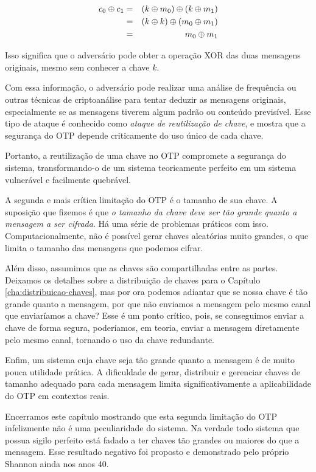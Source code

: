\begin{eqnarray*}
  c_0 \oplus c_1 & = & (k \oplus m_0) \oplus (k \oplus m_1)\\
              & = & (k \oplus k) \oplus (m_0 \oplus m_1)\\
              & = & m_0 \oplus m_1
\end{eqnarray*}

Isso significa que o adversário pode obter a operação XOR das duas mensagens originais, mesmo sem conhecer a chave $k$.

Com essa informação, o adversário pode realizar uma análise de frequência ou outras técnicas de criptoanálise para tentar deduzir as mensagens originais, especialmente se as mensagens tiverem algum padrão ou conteúdo previsível.
Esse tipo de ataque é conhecido como {\em ataque de reutilização de chave}, e mostra que a segurança do OTP depende criticamente do uso único de cada chave.

Portanto, a reutilização de uma chave no OTP compromete a segurança do sistema, transformando-o de um sistema teoricamente perfeito em um sistema vulnerável e facilmente quebrável.

A segunda e mais crítica limitação do OTP é o tamanho de sua chave.
A suposição que fizemos é que {\em o tamanho da chave deve ser tão grande quanto a mensagem a ser cifrada}.
Há uma série de problemas práticos com isso.
Computacionalmente, não é possível gerar chaves aleatórias muito grandes, o que limita o tamanho das mensagens que podemos cifrar.

Além disso, assumimos que as chaves são compartilhadas entre as partes.
Deixamos os detalhes sobre a distribuição de chaves para o Capítulo \ref{cha:distribuicao-chaves}, mas por ora podemos adiantar que se nossa chave é tão grande quanto a mensagem, por que não enviamos a mensagem pelo mesmo canal que enviaríamos a chave?
Esse é um ponto crítico, pois, se conseguimos enviar a chave de forma segura, poderíamos, em teoria, enviar a mensagem diretamente pelo mesmo canal, tornando o uso da chave redundante.

Enfim, um sistema cuja chave seja tão grande quanto a mensagem é de muito pouca utilidade prática.
A dificuldade de gerar, distribuir e gerenciar chaves de tamanho adequado para cada mensagem limita significativamente a aplicabilidade do OTP em contextos reais.

Encerramos este capítulo mostrando que esta segunda limitação do OTP infelizmente não é uma peculiaridade do sistema.
Na verdade todo sistema que possua sigilo perfeito está fadado a ter chaves tão grandes ou maiores do que a mensagem.
Esse resultado negativo foi proposto e demonstrado pelo próprio Shannon ainda nos anos 40.


